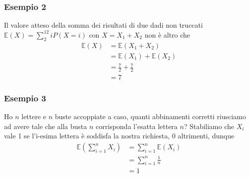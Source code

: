 \documentclass[11pt]{report}
\begin{document}
\subsubsection{Esempio 2}
Il valore atteso della somma dei risultati di due dadi non truccati $\mathbb{E}(X) = \sum_{2}^{12} iP(X=i)$ con $X = X_1 + X_2$ non è altro che
\begin{equation}
    \begin{split}
        \mathbb{E}(X) & = \mathbb{E}(X_1 + X_2)\\
        & = \mathbb{E}(X_1) + \mathbb{E}(X_2)\\
        & = \frac{7}{2} + \frac{7}{2}\\
        & = 7
    \end{split}
\end{equation}
\subsubsection{Esempio 3}
Ho $n$ lettere e $n$ buste accoppiate a caso, quanti abbinamenti corretti riusciamo ad avere tale che alla busta $n$ corrisponda l'esatta lettera $n$? Stabiliamo che $X_i$ vale 1 se l'i-esima lettera è soddisfa la nostra richiesta, 0 altrimenti, dunque
\begin{equation}
    \begin{split}
        \mathbb{E}\left(\sum_{i=1}^n X_i \right) & = \sum_{i=1}^n \mathbb{E}(X_i)\\
        & = \sum_{i=1}^n \frac{1}{n}\\
        & = 1
    \end{split}
\end{equation}
\end{document}
